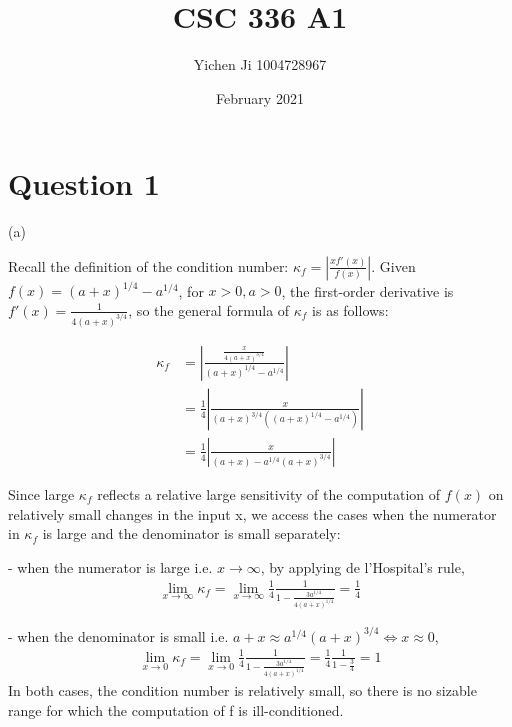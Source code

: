 \documentclass[12pt]{article}
\title{CSC 336 A1}
\author{Yichen Ji 1004728967}
\date{February 2021}
\begin{document}
\maketitle

\section{Question 1}

(a)

Recall the definition of the condition number: $\kappa_f = |\frac{x f'(x)}{f(x)}|$. Given $f(x) = (a+x)^{1/4}-a^{1/4}$, for $x>0, a>0$, the first-order derivative is $f'(x) = \frac{1}{4(a+x)^{3/4}}$, so the general formula of $\kappa_f$ is as follows:

\begin{equation*}
\begin{split}
\kappa_f & = |\frac{\frac{x}{4(a+x)^{3/4}}}{(a+x)^{1/4}-a^{1/4}}| \\
 & = \frac{1}{4}|\frac{x}{(a+x)^{3/4}((a+x)^{1/4}-a^{1/4})}|\\
 & = \frac{1}{4}|\frac{x}{(a+x)-a^{1/4}(a+x)^{3/4}}|
\end{split}
\end{equation*}

Since large $\kappa_f$ reflects a relative large sensitivity of the computation of $f(x)$ on relatively small changes in the input x, we access the cases when the numerator in $\kappa_f$ is large and the denominator is small separately:

- when the numerator is large i.e. $x \to \infty$, by applying de l'Hospital's rule, 
\begin{equation*}
\begin{split}
\lim_{x \to \infty} \kappa_f =
\lim_{x \to \infty} \frac{1}{4}\frac{1}{1-\frac{3a^{1/4}}{4(a+x)^{1/4}}}=\frac{1}{4}
\end{split}
\end{equation*}

- when the denominator is small i.e. $a+x \approx a^{1/4}(a+x)^{3/4} \Leftrightarrow x \approx 0$,
\begin{equation*}
\begin{split}
\lim_{x \to 0} \kappa_f =
\lim_{x \to 0} \frac{1}{4}\frac{1}{1-\frac{3a^{1/4}}{4(a+x)^{1/4}}}=\frac{1}{4}\frac{1}{1-\frac{3}{4}} = 1
\end{split}
\end{equation*}
In both cases, the condition number is relatively small, so there is no sizable range for which the computation of f is ill-conditioned.
\end{document}
